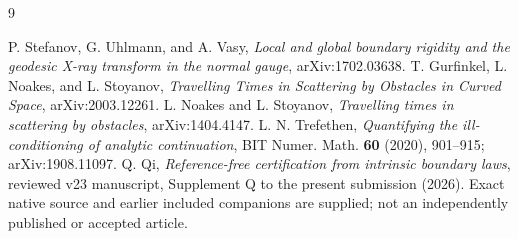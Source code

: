 \begin{thebibliography}{9}
\raggedright
{}
P. Stefanov, G. Uhlmann, and A. Vasy,
\emph{Local and global boundary rigidity and the geodesic X-ray transform
in the normal gauge}, arXiv:1702.03638.
T. Gurfinkel, L. Noakes, and L. Stoyanov,
\emph{Travelling Times in Scattering by Obstacles in Curved Space},
arXiv:2003.12261.
L. Noakes and L. Stoyanov,
\emph{Travelling times in scattering by obstacles}, arXiv:1404.4147.
L. N. Trefethen, \emph{Quantifying the ill-conditioning of analytic
continuation}, BIT Numer. Math. \textbf{60} (2020), 901--915;
arXiv:1908.11097.
Q. Qi, \emph{Reference-free certification from intrinsic boundary laws},
reviewed v23 manuscript, Supplement Q to the present submission (2026).
Exact native source and earlier included companions are supplied;
not an independently published or accepted article.
\end{thebibliography}
